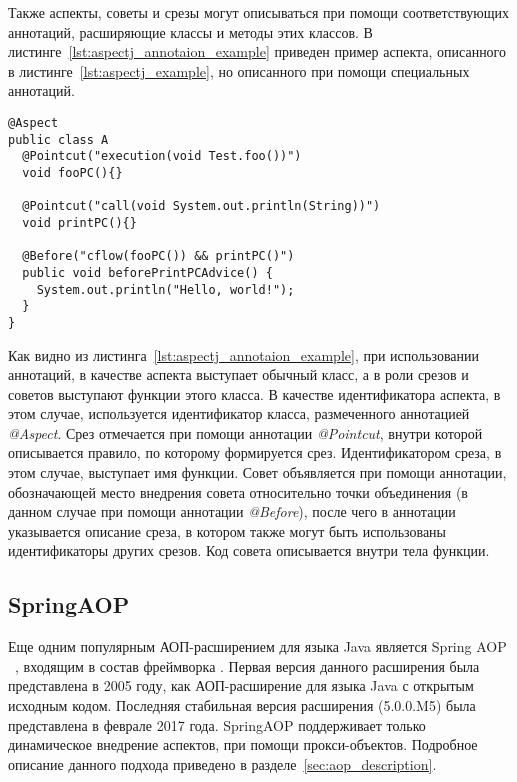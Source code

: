 Также аспекты, советы и срезы могут описываться при помощи соответствующих
аннотаций, расширяющие классы и методы этих классов.
В листинге~\ref{lst:aspectj_annotaion_example} приведен пример аспекта,
описанного в листинге~\ref{lst:aspectj_example}, но описанного при помощи
специальных аннотаций.
  \begin{lstlisting}[style={java}, label={lst:aspectj_annotaion_example}, 
  caption={Пример описания аспектов в AspectJ при помощи аннотаций}]
@Aspect
public class A
  @Pointcut("execution(void Test.foo())")
  void fooPC(){}

  @Pointcut("call(void System.out.println(String))")
  void printPC(){}

  @Before("cflow(fooPC()) && printPC()")
  public void beforePrintPCAdvice() {
    System.out.println("Hello, world!");
  }
}
\end{lstlisting}

Как видно из листинга~\ref{lst:aspectj_annotaion_example}, при использовании
аннотаций, в качестве аспекта выступает обычный класс, а в роли срезов и советов
выступают функции этого класса.
В качестве идентификатора аспекта, в этом случае, используется идентификатор
класса, размеченного аннотацией \textit{@Aspect}.
Срез отмечается при помощи аннотации \textit{@Pointcut}, внутри которой
описывается правило, по которому формируется срез.
Идентификатором среза, в этом случае, выступает имя функции.
Совет объявляется при помощи аннотации, обозначающей место внедрения совета
относительно точки объединения (в данном случае при помощи аннотации
\textit{@Before}), после чего в аннотации указывается описание среза, в котором
также могут быть использованы идентификаторы других срезов.
Код совета описывается внутри тела функции.

\subsection{SpringAOP}
\label{sub:spring_aop_overwiev}
Еще одним популярным АОП-расширением для языка Java является Spring AOP
~\cite{spring_aop}, входящим в состав фреймворка .
Первая версия данного расширения была представлена в 2005 году, как
АОП-расширение для языка Java с открытым исходным кодом.
Последняя стабильная версия расширения (5.0.0.M5) была представлена в феврале
2017 года.
SpringAOP поддерживает только динамическое внедрение аспектов, при помощи
прокси-объектов.
Подробное описание данного подхода приведено в разделе~\ref{sec:aop_description}.


